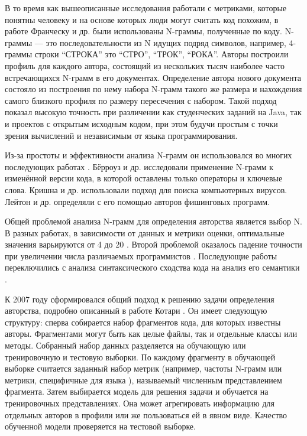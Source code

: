 В то время как вышеописанные исследования работали с метриками, которые понятны человеку и на основе которых люди могут считать код похожим, в работе Франческу и др. \cite{Frantzeskou2006, Frantzeskou2007} были использованы N-граммы, полученные по коду. N-граммы — это последовательности из N идущих подряд символов, например, 4-граммы строки “СТРОКА” это {“СТРО”, “ТРОК”, “РОКА”}. Авторы построили профиль для каждого автора, состоящий из нескольких тысяч наиболее часто встречающихся N-грамм в его документах. Определение автора нового документа состояло из построения по нему набора N-грамм такого же размера и нахождения самого близкого профиля по размеру пересечения с набором. Такой подход показал высокую точность при различении как студенческих заданий на Java, так и проектов с открытым исходным кодом, при этом будучи простым с точки зрения вычислений и независимым от языка программирования.

Из-за простоты и эффективности анализа N-грамм он использовался во многих последующих работах \cite{Burrows2007, Krishna2006, Layton2010}. Бёрроуз и др. \cite{Burrows2007} исследовали применение N-грамм к изменённой версии кода, в которой оставлены только операторы и ключевые слова. Кришна и др. \cite{Krishna2006} использовали подход для поиска компьютерных вирусов. Лейтон и др. \cite{Layton2010} определяли с его помощью авторов фишинговых программ.

Общей проблемой анализа N-грамм для определения авторства является выбор N. В разных работах, в зависимости от данных и метрики оценки, оптимальные значения варьируются от 4 \cite{Kothari2007} до 20 \cite{Burrows2007}. Второй проблемой оказалось падение точности при увеличении числа различаемых программистов \cite{Burrows2007}. Последующие работы переключились с анализа синтаксического сходства кода на анализ его семантики \cite{Vinod2012, Caliskan2015, Chen2010}.


К 2007 году сформировался общий подход к решению задачи определения авторства, подробно описанный в работе Котари \cite{Kothari2007}. Он имеет следующую структуру: сперва собирается набор фрагментов кода, для которых известны авторы. Фрагментами могут быть как целые файлы, так и отдельные классы или методы. Собранный набор данных разделяется на обучающую или тренировочную и тестовую выборки. По каждому фрагменту в обучающей выборке считается заданный набор метрик (например, частоты N-грамм \cite{Frantzeskou2006} или метрики, специфичные для языка \cite{Macdonell1999}), называемый численным представлением фрагмента. Затем выбирается модель для решения задачи и обучается на тренировочных представлениях. Она может агрегировать информацию для отдельных авторов в профили или же пользоваться ей в явном виде. Качество обученной модели проверяется на тестовой выборке.

